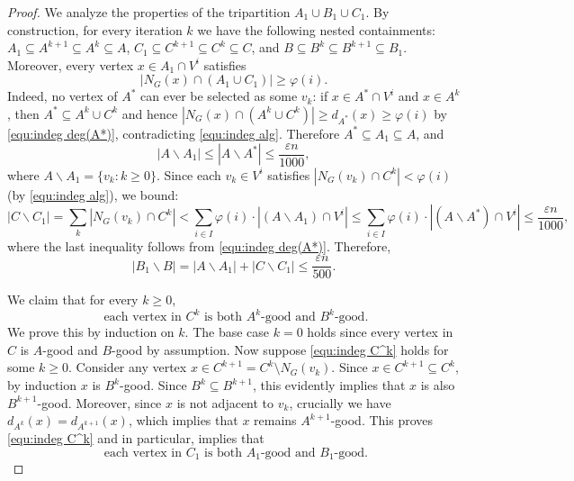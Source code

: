 \documentclass[10pt,a4paper]{amsart}
\begin{document}
\begin{proof}
		We analyze the properties of the tripartition $A_1 \cup B_1 \cup C_1$.
		By construction, for every iteration $k$ we have the following nested containments: $A_1\subseteq A^{k+1}\subseteq A^k\subseteq A$,
		$C_1\subseteq C^{k+1}\subseteq C^k\subseteq C$, and $B\subseteq B^k\subseteq B^{k+1}\subseteq B_1$.
		Moreover, every vertex $x\in A_1\cap V^i$ satisfies
		\begin{equation}
			\label{equ:indeg A'}
			|N_G(x)\cap (A_1\cup C_1)|\ge \varphi(i).
		\end{equation}
		Indeed, no vertex of $A^*$ can ever be selected as some $v_k$: if $x\in A^*\cap V^i$ and $x\in A^k$, then $A^*\subseteq A^k\cup C^k$ and hence
		$|N_G(x)\cap (A^k\cup C^k)|\ge d_{A^*}(x)\ge \varphi(i)$ by \eqref{equ:indeg deg(A*)}, contradicting \eqref{equ:indeg alg}.
		Therefore $A^*\subseteq A_1\subseteq A$, and
		\begin{equation}
			\label{equ:indeg A-A'}
			|A\backslash A_1|\le |A\backslash A^*|\le \frac{\varepsilon n}{1000},
		\end{equation}
		where $A\backslash A_1=\{v_k:k\ge 0\}$.
		Since each $v_k \in V^i$ satisfies $|N_G(v_k) \cap C^k| < \varphi(i)$ (by \eqref{equ:indeg alg}), we bound:
		\begin{equation}
			\label{equ:indeg C-C'}
			|C\backslash C_1|=\sum_{k} |N_G(v_k)\cap C^k|<\sum_{i\in I} \varphi(i)\cdot |(A\backslash A_1)\cap V^i|\le
			\sum_{i\in I} \varphi(i)\cdot |(A\backslash A^*)\cap V^i|\le \frac{\varepsilon n}{1000},
		\end{equation}
		where the last inequality follows from \eqref{equ:indeg deg(A*)}. Therefore,
		\begin{equation}
			\label{equ:indeg B'-B}
			|B_1\backslash B|=|A\backslash A_1|+|C\backslash C_1| \le \frac{\varepsilon n}{500}.
		\end{equation}
		
		We claim that for every $k\geq 0$,
		\begin{equation}
			\label{equ:indeg C^k}
			\text{ each vertex in } C^k \text{ is both } A^k\text{-good  and } B^k\text{-good}.
		\end{equation}
		We prove this by induction on $k$. The base case $k=0$ holds since every vertex in $C$ is $A$-good and $B$-good by assumption.
		Now suppose \eqref{equ:indeg C^k} holds for some $k \geq 0$. Consider any vertex $x \in C^{k+1} = C^k \setminus N_G(v_k)$.
		Since $x\in C^{k+1}\subseteq C^k$, by induction $x$ is $B^k$-good.
		Since $B^k \subseteq B^{k+1}$, this evidently implies that $x$ is also $B^{k+1}$-good.
		Moreover, since $x$ is not adjacent to $v_k$, crucially we have $d_{A^k}(x) = d_{A^{k+1}}(x)$,
		which implies that $x$ remains $A^{k+1}$-good.
		This proves \eqref{equ:indeg C^k} and in particular, implies that
		\begin{equation}
			\label{equ:indeg C'}
			\text{ each vertex in } C_1 \text{ is both } A_1\text{-good  and } B_1\text{-good}.
		\end{equation}
		

\end{proof}
\end{document}
